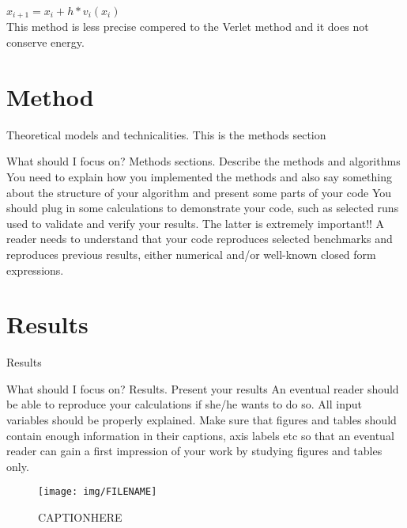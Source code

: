 \documentclass{article}
\begin{document}
    $x_{i+1} = x_i +  h*v_{i}(x_i) $ \\

    This method is less precise compered to the Verlet method and it does not conserve energy. \\


\vspace{1cm}

\section{Method} \label{sec:Method}

Theoretical models and technicalities. This is the methods section


What should I focus on? Methods sections.
Describe the methods and algorithms
You need to explain how you implemented the methods and also say something about the structure of your algorithm and present some parts of your code
You should plug in some calculations to demonstrate your code, such as selected runs used to validate and verify your results. The latter is extremely important!! A reader needs to understand that your code reproduces selected benchmarks and reproduces previous results, either numerical and/or well-known closed form expressions.

\vspace{1cm}

\section{Results} \label{sec:Results}

Results

What should I focus on? Results.
Present your results
An eventual reader should be able to reproduce your calculations if she/he wants to do so. All input variables should be properly explained.
Make sure that figures and tables should contain enough information in their captions, axis labels etc so that an eventual reader can gain a first impression of your work by studying figures and tables only.

\iffalse
  \begin{figure}[H]
      \centering
      \texttt{[image: img/FILENAME]}
      \caption{CAPTIONHERE}
      \label{fig:LABELHERE}
    \end{figure}
\end{document}
